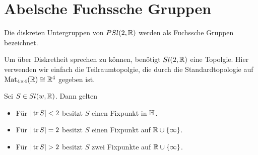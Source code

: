 
\section{Abelsche Fuchssche Gruppen}
\label{sec:fuchs}


\begin{defin}
  Die diskreten Untergruppen von $PSl(2,\mathbb{R})$ werden als Fuchssche
  Gruppen bezeichnet.
\end{defin}

\begin{rem}
  Um über Diskretheit sprechen zu können, benötigt $Sl(2, \mathbb{R})$
    eine Topolgie. Hier verwenden wir einfach die Teilraumtopolgie,
    die durch die Standardtopologie auf $\operatorname{Mat}_{4\times4}(\mathbb{R}) \cong
    \mathbb{R}^4$ gegeben ist.
\end{rem}

\begin{thm}
  \label{thm:fixpkt}
  Sei $S \in Sl(w, \mathbb{R})$. Dann gelten
  \begin{itemize}
  \item Für $|\operatorname{tr} S| < 2$ besitzt $S$ einen Fixpunkt in $\mathbb{H}$.
  \item Für $|\operatorname{tr} S| = 2$ besitzt $S$ einen Fixpunkt auf $\mathbb{R} \cup \{\infty\}$.
  \item Für $|\operatorname{tr} S| > 2$ besitzt $S$ zwei Fixpunkte auf $\mathbb{R} \cup \{\infty\}$.
  \end{itemize}
\end{thm}

